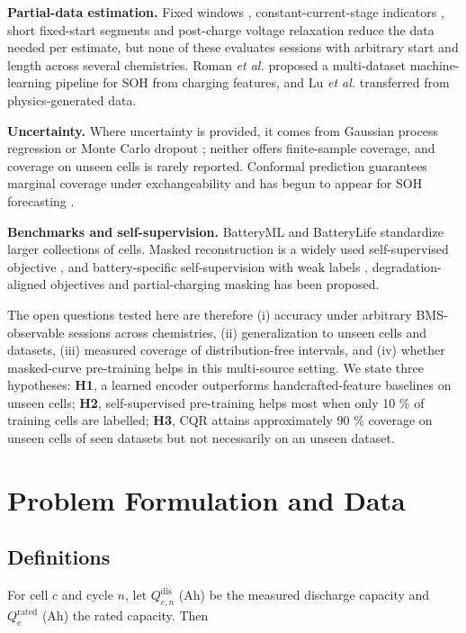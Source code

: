 \documentclass[journal]{IEEEtran}
\begin{document}
\textbf{Partial-data estimation.} Fixed windows \cite{b1}, constant-current-stage indicators \cite{b7}, short fixed-start segments \cite{b13} and post-charge voltage relaxation \cite{b14} reduce the data needed per estimate, but none of these evaluates sessions with arbitrary start and length across several chemistries. Roman \emph{et al.} \cite{b12} proposed a multi-dataset machine-learning pipeline for SOH from charging features, and Lu \emph{et al.} \cite{b15} transferred from physics-generated data.

\textbf{Uncertainty.} Where uncertainty is provided, it comes from Gaussian process regression \cite{b3} or Monte Carlo dropout \cite{b5}; neither offers finite-sample coverage, and coverage on unseen cells is rarely reported. Conformal prediction \cite{b17} guarantees marginal coverage under exchangeability and has begun to appear for SOH forecasting \cite{b22}.

\textbf{Benchmarks and self-supervision.} BatteryML \cite{b23} and BatteryLife \cite{b24} standardize larger collections of cells. Masked reconstruction is a widely used self-supervised objective \cite{b16}, and battery-specific self-supervision with weak labels \cite{b19}, degradation-aligned objectives \cite{b21} and partial-charging masking \cite{b20} has been proposed.

The open questions tested here are therefore (i) accuracy under arbitrary BMS-observable sessions across chemistries, (ii) generalization to unseen cells and datasets, (iii) measured coverage of distribution-free intervals, and (iv) whether masked-curve pre-training helps in this multi-source setting. We state three hypotheses: \textbf{H1}, a learned encoder outperforms handcrafted-feature baselines on unseen cells; \textbf{H2}, self-supervised pre-training helps most when only 10 \% of training cells are labelled; \textbf{H3}, CQR attains approximately 90 \% coverage on unseen cells of seen datasets but not necessarily on an unseen dataset.

\section{Problem Formulation and Data}
\subsection{Definitions}
For cell \(c\) and cycle \(n\), let \(Q^{\mathrm{dis}}_{c,n}\) (Ah) be the measured discharge capacity and \(Q^{\mathrm{rated}}_c\) (Ah) the rated capacity. Then
\end{document}
